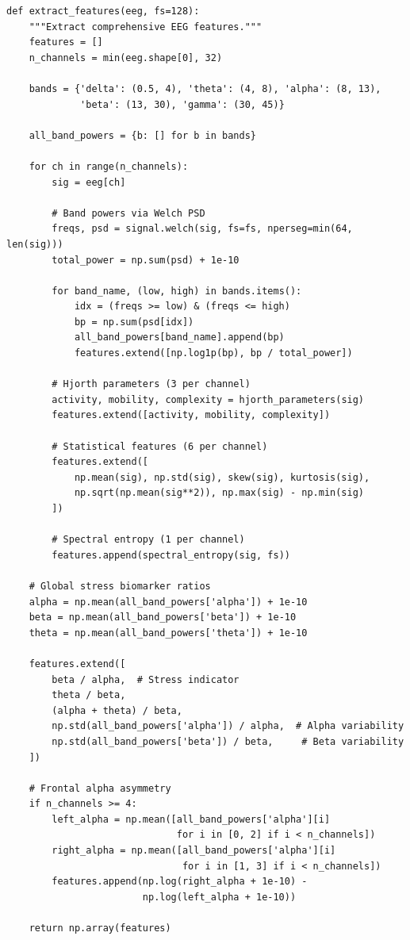 \documentclass[11pt,a4paper]{article}
\begin{document}
\begin{lstlisting}[caption={Comprehensive EEG feature extraction (515 features per sample)}]
def extract_features(eeg, fs=128):
    """Extract comprehensive EEG features."""
    features = []
    n_channels = min(eeg.shape[0], 32)

    bands = {'delta': (0.5, 4), 'theta': (4, 8), 'alpha': (8, 13),
             'beta': (13, 30), 'gamma': (30, 45)}

    all_band_powers = {b: [] for b in bands}

    for ch in range(n_channels):
        sig = eeg[ch]

        # Band powers via Welch PSD
        freqs, psd = signal.welch(sig, fs=fs, nperseg=min(64, len(sig)))
        total_power = np.sum(psd) + 1e-10

        for band_name, (low, high) in bands.items():
            idx = (freqs >= low) & (freqs <= high)
            bp = np.sum(psd[idx])
            all_band_powers[band_name].append(bp)
            features.extend([np.log1p(bp), bp / total_power])

        # Hjorth parameters (3 per channel)
        activity, mobility, complexity = hjorth_parameters(sig)
        features.extend([activity, mobility, complexity])

        # Statistical features (6 per channel)
        features.extend([
            np.mean(sig), np.std(sig), skew(sig), kurtosis(sig),
            np.sqrt(np.mean(sig**2)), np.max(sig) - np.min(sig)
        ])

        # Spectral entropy (1 per channel)
        features.append(spectral_entropy(sig, fs))

    # Global stress biomarker ratios
    alpha = np.mean(all_band_powers['alpha']) + 1e-10
    beta = np.mean(all_band_powers['beta']) + 1e-10
    theta = np.mean(all_band_powers['theta']) + 1e-10

    features.extend([
        beta / alpha,  # Stress indicator
        theta / beta,
        (alpha + theta) / beta,
        np.std(all_band_powers['alpha']) / alpha,  # Alpha variability
        np.std(all_band_powers['beta']) / beta,     # Beta variability
    ])

    # Frontal alpha asymmetry
    if n_channels >= 4:
        left_alpha = np.mean([all_band_powers['alpha'][i]
                              for i in [0, 2] if i < n_channels])
        right_alpha = np.mean([all_band_powers['alpha'][i]
                               for i in [1, 3] if i < n_channels])
        features.append(np.log(right_alpha + 1e-10) -
                        np.log(left_alpha + 1e-10))

    return np.array(features)
\end{lstlisting}
\end{document}
